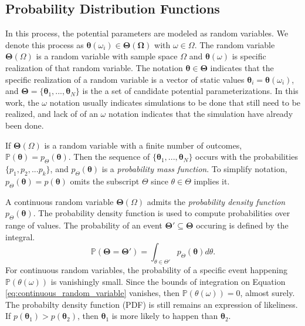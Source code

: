 \subsection{Probability Distribution Functions}

In this process, the potential parameters are modeled as random variables.  We denote this process as $\bm{\theta}(\omega_i) \in \bm{\Theta(\Omega)}$ with $\omega \in \Omega$.  The random variable $\bm{\Theta}(\Omega)$ is a random variable with sample space $\Omega$ and $\bm{\theta}(\omega)$ is specific realization of that random variable.
The notation $\bm{\theta} \in \bm{\Theta}$ indicates that the specific realization of a random variable is a vector of static values $\bm{\theta}_i=\bm{\theta}(\omega_i)$, and $\bm{\Theta}=\{\bm{\theta}_1,...,\bm{\theta}_N\}$ is the a set of candidate potential parameterizations.  In this work, the $\omega$ notation usually indicates simulations to be done that still need to be realized, and lack of of an $\omega$ notation indicates that the simulation have already been done.

If $\bm{\Theta}(\Omega)$ is a random variable with a finite number of outcomes, $\mathbb{P}(\bm{\theta})=p_{\Theta}(\bm{\theta})$.  Then the sequence of $\{\bm{\theta}_1,...,\bm{\theta}_N\}$ occurs with the probabilities $\{p_1,p_2,...p_k\}$, and $p_{\Theta}(\bm{\theta})$ is a \emph{probability mass function}.  To simplify notation, $p_\Theta(\bm{\theta})=p(\bm{\theta})$ omits the subscript $\Theta$ since $\theta\in\Theta$ implies it.

A continuous random variable $\bm{\Theta}(\Omega)$ admits the \emph{probability density function} $p_{\Theta}(\bm{\theta})$. The probability density function is used to compute probabilities over range of values. The probability of an event $\bm{\Theta}' \subseteq \bm{\Theta}$ occuring is defined by the integral.
\begin{equation}
	\label{eq:continuous_random_variable}
  \mathbb{P}(\bm{\Theta}=\bm{\Theta}')
	=
	\int_{\theta \in \Theta'} p_{\Theta}(\bm{\theta}) d \theta.
\end{equation}
For continuous random variables, the probability of a specific event happening $\mathbb{P}(\theta(\omega))$ is vanishingly small.  Since the bounds of integration on Equation \ref{eq:continuous_random_variable} vanishes, then $\mathbb{P}(\theta(\omega))=0$, almost surely.  The probabilty density function (PDF) is still remains an expression of likeliness.  If $p(\bm{\theta}_1)>p(\bm{\theta}_2)$, then $\bm{\theta}_1$ is more likely to happen than $\bm{\theta}_2$.

